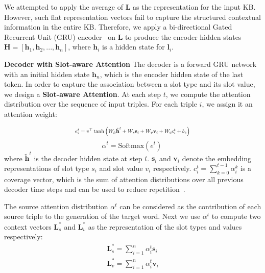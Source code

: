 \documentclass[11pt,a4paper]{article}
\begin{document}
We attempted to apply the average of $\textbf{L}$ as the representation for the input KB. However, such flat representation vectors fail to capture the structured contextual information in the entire KB. Therefore, we apply a bi-directional Gated Recurrent Unit (GRU) encoder~\citep{cho2014learning} on $\textbf{L}$ to produce the encoder hidden states $\textbf{H}=[\textbf{h}_1, \textbf{h}_2, ..., \textbf{h}_n]$, where $\textbf{h}_i$ is a hidden state for $\textbf{l}_i$. 


\textbf{Decoder with Slot-aware Attention} The decoder is a forward GRU network with an initial hidden state $\textbf{h}_n$, which is the encoder hidden state of the last token. In order to capture the association between a slot type and its slot value, we design a \textbf{Slot-aware Attention}. At each step $t$, we compute the attention distribution over the sequence of input triples. For each triple $i$, we assign it an attention weight: 

\begin{displaymath}
\vspace{-2mm}
\resizebox{.48 \textwidth}{!}{
$e^{t}_{i} = v^{\top}\tanh{\left(W_h \tilde{\textbf{h}}^t + W_s \textbf{s}_i + W_v \textbf{v}_i +  W_c c^{t}_{i} +b_e\right)}$
}
\end{displaymath}
\begin{displaymath}
\alpha ^t= \text{Softmax}\left(e^{t}\right) \ 
\end{displaymath}
where $\tilde{\textbf{h}}^t$ is the decoder hidden state at step $t$. $\textbf{s}_i$ and $\textbf{v}_i$ denote the embedding representations of slot type $s_i$ and slot value $v_i$ respectively. $c^t_{i}=\sum_{k=0}^{t-1}\alpha ^{k}_{i}$ is a coverage vector, which is the sum of attention distributions over all previous decoder time steps and can be used to reduce repetition~\cite{hybridp17}.

The source attention distribution $\alpha^{t}$ can be considered as the contribution of each source triple to the generation of the target word. Next we use $\alpha^t$ to compute two context vectors $\textbf{L}_{s}^{*}$ and $\textbf{L}_{v}^{*}$ as the representation of the slot types and values respectively:
\begin{equation}
\begin{split}
\textbf{L}_{s}^{*} =\sum\nolimits_{i=1}^{n} \alpha^{t}_{i} \textbf{s}_i
\\
\textbf{L}_{v}^{*} =\sum\nolimits_{i=1}^{n} \alpha^{t}_{i} \textbf{v}_i
\end{split}
\label{eq:slotContext}
\end{equation}
\end{document}
